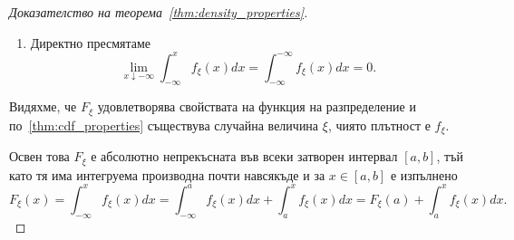 \documentclass[numbers=endperiod, bibliography=totocnumbered]{scrartcl}
\begin{document}
\begin{proof}[Доказателство на теорема~\ref{thm:density_properties}]
\begin{enumerate}
    \item Директно пресмятаме
    \begin{equation*}
      \lim_{x \downarrow -\infty} \int_{-\infty}^x f_\xi(x) dx
      =
      \int_{-\infty}^{-\infty} f_\xi(x) dx
      =
      0.
    \end{equation*}
  \end{enumerate}

  Видяхме, че \( F_\xi \) удовлетворява свойствата на функция на разпределение и по~\ref{thm:cdf_properties} съществува случайна величина \( \xi \), чиято плътност е \( f_\xi \).

  Освен това \( F_\xi \) е абсолютно непрекъсната във всеки затворен интервал \( [a, b] \), тъй като тя има интегруема производна почти навсякъде и за \( x \in [a, b] \) е изпълнено
  \begin{equation*}
    F_\xi(x)
    =
    \int_{-\infty}^x f_\xi(x) dx
    =
    \int_{-\infty}^a f_\xi(x) dx + \int_a^x f_\xi(x) dx
    =
    F_\xi(a) + \int_a^x f_\xi(x) dx.
  \end{equation*}
\end{proof}
\end{document}
